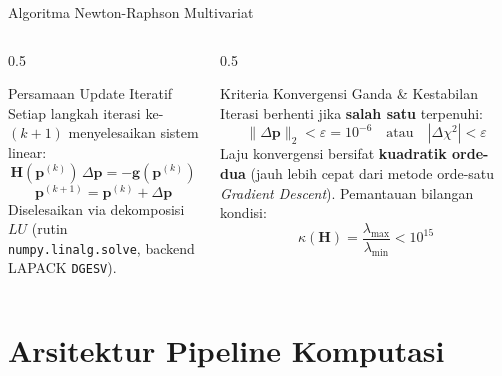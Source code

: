 \documentclass[aspectratio=169, 10pt]{beamer}
\begin{document}
\begin{frame}{Algoritma Newton-Raphson Multivariat}
	\begin{columns}[T]
		\begin{column}{0.5\textwidth}
			\begin{block}{Persamaan Update Iteratif}
				\small
				Setiap langkah iterasi ke-$(k+1)$ menyelesaikan sistem linear:
				\begin{equation}
					\mathbf{H}(\mathbf{p}^{(k)})\,\Delta\mathbf{p} = -\mathbf{g}(\mathbf{p}^{(k)})
				\end{equation}
				\begin{equation}
					\mathbf{p}^{(k+1)} = \mathbf{p}^{(k)} + \Delta\mathbf{p}
				\end{equation}
				\footnotesize
				Diselesaikan via dekomposisi $LU$ (rutin \texttt{numpy.linalg.solve}, backend LAPACK \texttt{DGESV}).
			\end{block}
		\end{column}

		\begin{column}{0.5\textwidth}
			\begin{exampleblock}{Kriteria Konvergensi Ganda \& Kestabilan}
				\small
				Iterasi berhenti jika \textbf{salah satu} terpenuhi:
				\begin{equation*}
					\|\Delta\mathbf{p}\|_2 < \varepsilon = 10^{-6} \quad \text{atau} \quad |\Delta\chi^2| < \varepsilon
				\end{equation*}
				\footnotesize
				Laju konvergensi bersifat \textbf{kuadratik orde-dua} (jauh lebih cepat dari metode orde-satu \textit{Gradient Descent}). Pemantauan bilangan kondisi:
				\begin{equation*}
					\kappa(\mathbf{H}) = \frac{\lambda_{\max}}{\lambda_{\min}} < 10^{15}
				\end{equation*}
			\end{exampleblock}
		\end{column}
	\end{columns}
\end{frame}


\section{Arsitektur Pipeline Komputasi}
\end{document}
